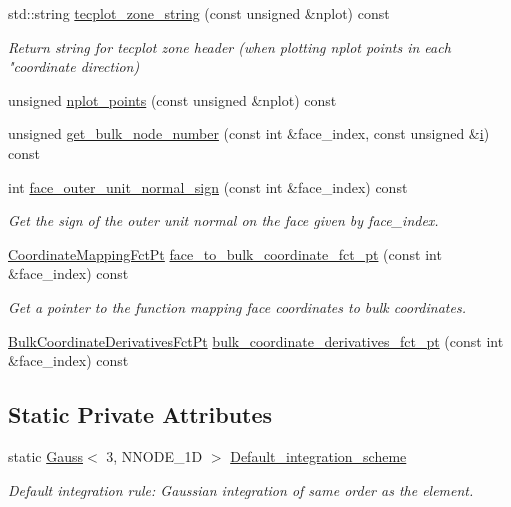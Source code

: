 \begin{DoxyCompactItemize}
std\+::string \hyperlink{classoomph_1_1QElement_3_013_00_01NNODE__1D_01_4_aa126ecfc38839bd7338db16d6d8f09d9}{tecplot\+\_\+zone\+\_\+string} (const unsigned \&nplot) const
\begin{DoxyCompactList}\small\item\em Return string for tecplot zone header (when plotting nplot points in each "coordinate direction) \end{DoxyCompactList}\item 
unsigned \hyperlink{classoomph_1_1QElement_3_013_00_01NNODE__1D_01_4_a00c72c9e208bc8db3cd2203d65b30a60}{nplot\+\_\+points} (const unsigned \&nplot) const
\item 
unsigned \hyperlink{classoomph_1_1QElement_3_013_00_01NNODE__1D_01_4_a8ce678f07f62aea2f676737374758820}{get\+\_\+bulk\+\_\+node\+\_\+number} (const int \&face\+\_\+index, const unsigned \&\hyperlink{cfortran_8h_adb50e893b86b3e55e751a42eab3cba82}{i}) const
\item 
int \hyperlink{classoomph_1_1QElement_3_013_00_01NNODE__1D_01_4_a27d826493ef1ae3d2898409f302d37f8}{face\+\_\+outer\+\_\+unit\+\_\+normal\+\_\+sign} (const int \&face\+\_\+index) const
\begin{DoxyCompactList}\small\item\em Get the sign of the outer unit normal on the face given by face\+\_\+index. \end{DoxyCompactList}\item 
\hyperlink{namespaceoomph_afa5c7a93cae1917e874b392601be0bde}{Coordinate\+Mapping\+Fct\+Pt} \hyperlink{classoomph_1_1QElement_3_013_00_01NNODE__1D_01_4_a6803c44633cc3fccaddbfa7c3077adbb}{face\+\_\+to\+\_\+bulk\+\_\+coordinate\+\_\+fct\+\_\+pt} (const int \&face\+\_\+index) const
\begin{DoxyCompactList}\small\item\em Get a pointer to the function mapping face coordinates to bulk coordinates. \end{DoxyCompactList}\item 
\hyperlink{namespaceoomph_a0a75fbfa1139f00cf88adeee835c8fe5}{Bulk\+Coordinate\+Derivatives\+Fct\+Pt} \hyperlink{classoomph_1_1QElement_3_013_00_01NNODE__1D_01_4_a2d0db26e0413a1df4885af59cbf57efd}{bulk\+\_\+coordinate\+\_\+derivatives\+\_\+fct\+\_\+pt} (const int \&face\+\_\+index) const
\end{DoxyCompactItemize}
\subsection*{Static Private Attributes}
\begin{DoxyCompactItemize}
\item 
static \hyperlink{classoomph_1_1Gauss}{Gauss}$<$ 3, N\+N\+O\+D\+E\+\_\+1D $>$ \hyperlink{classoomph_1_1QElement_3_013_00_01NNODE__1D_01_4_adfd6bf6124a73f57866d79ff85839bac}{Default\+\_\+integration\+\_\+scheme}
\begin{DoxyCompactList}\small\item\em Default integration rule\+: Gaussian integration of same \textquotesingle{}order\textquotesingle{} as the element. \end{DoxyCompactList}\end{DoxyCompactItemize}
